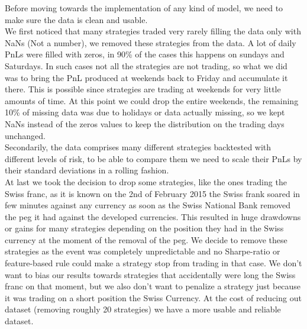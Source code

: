 Before moving towards the implementation of any kind of model, we need to make sure the data is clean and usable.\\
We first noticed that many strategies traded very rarely filling the data only with NaNs (Not a number), we removed these strategies from the data. A lot of daily PnLs were filled with zeros, in 90\% of the cases this happens on sundays and Saturdays. In such cases not all the strategies are not trading, so what we did was to bring the PnL produced at weekends back to Friday and accumulate it there. This is possible since strategies are trading at weekends for very little amounts of time. At this point we could drop the entire weekends, the remaining 10\% of missing data was due to holidays or data actually missing, so we kept NaNs instead of the zeros values to keep the distribution on the trading days unchanged.\\  
Secondarily, the data comprises many different strategies backtested with different levels of risk, to be able to compare them we need to scale their PnLs by their standard deviations in a rolling fashion.\\
At last we took the decision to drop some strategies, like the ones trading the Swiss franc, as it is known on the 2nd of February 2015 the Swiss frank soared in few minutes against any currency as soon as the Swiss National Bank removed the peg it had against the developed currencies. This resulted in huge drawdowns or gains for many strategies depending on the position they had in the Swiss currency at the moment of the removal of the peg. We decide to remove these strategies as the event was completely unpredictable and no Sharpe-ratio or feature-based rule could make a strategy stop from trading in that case. We don't want to bias our results towards strategies that accidentally were long the Swiss franc on that moment, but we also don't want to penalize a strategy just because it was trading on a short position the Swiss Currency. At the cost of reducing out dataset (removing roughly 20 strategies) we have a more usable and reliable dataset.
